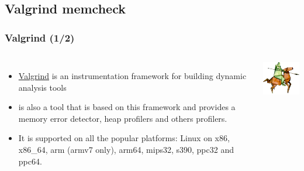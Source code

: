 \subsection{Valgrind memcheck}

\begin{frame}
  \frametitle{Valgrind (1/2)}
  \begin{columns}[T]
    \begin{itemize}
      \item \href{https://valgrind.org/}{Valgrind} is an instrumentation
            framework for building dynamic analysis tools
      \item {} is also a tool that is based on this framework
            and provides a memory error detector, heap profilers and others
            profilers.
      \item It is supported on all the popular platforms: Linux on x86, x86\_64,
            arm (armv7 only), arm64, mips32, s390, ppc32 and ppc64.
    \end{itemize}
    \includegraphics[width=\textwidth]{../common/valgrind1.png}
  \end{columns}
\end{frame}

